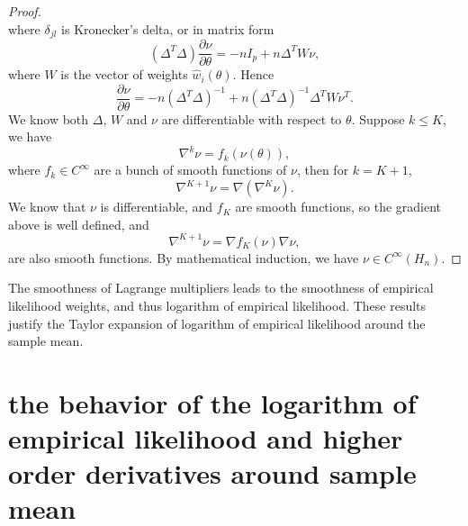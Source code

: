 \begin{proof}
\[\]
where $\delta_{jl}$ is Kronecker's delta, or in matrix form 
\[
\left(\Delta^{T}\Delta\right)\frac{\partial\nu}{\partial\theta}=-nI_{p}+n\Delta^{T}W\nu,
\]
where $W$ is the vector of weights $\hat{w}_{i}\left(\theta\right)$.
Hence 
\[
\frac{\partial\nu}{\partial\theta}=-n\left(\Delta^{T}\Delta\right)^{-1}+n\left(\Delta^{T}\Delta\right)^{-1}\Delta^{T}W\nu^{T}.
\]
We know both $\Delta$, $W$ and $\nu$ are differentiable with respect
to $\theta$. Suppose $k\le K$, we have 
\[
\nabla^{k}\nu=f_{k}\left(\nu\left(\theta\right)\right),
\]
where $f_{k}\in C^{\infty}$ are a bunch of smooth functions of $\nu$,
then for $k=K+1$, 
\[
\nabla^{K+1}\nu=\nabla\left(\nabla^{K}\nu\right).
\]
We know that $\nu$ is differentiable, and $f_{K}$ are smooth functions,
so the gradient above is well defined, and 
\[
\nabla^{K+1}\nu=\nabla f_{K}\left(\nu\right)\nabla\nu,
\]
are also smooth functions. By mathematical induction, we have $\nu\in C^{\infty}\left(H_{n}\right)$. 
\end{proof}
The smoothness of Lagrange multipliers leads to the smoothness of
empirical likelihood weights, and thus logarithm of empirical likelihood.
These results justify the Taylor expansion of logarithm of empirical
likelihood around the sample mean. 


\section{the behavior of the logarithm of empirical likelihood and higher
order derivatives around sample mean}

